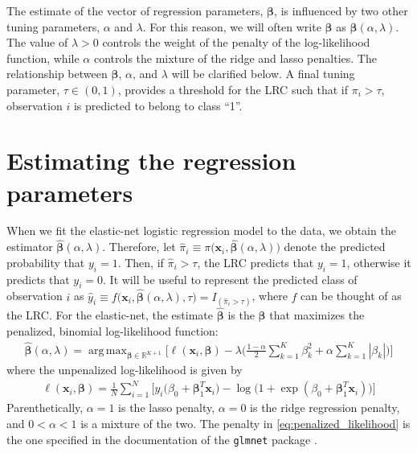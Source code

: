 \documentclass{article}
\DeclareMathOperator*{\argmax}{arg\,max}
\begin{document}
The estimate of the vector of regression parameters, $\boldsymbol{\beta}$, is influenced by two other tuning parameters, 
$\alpha$ and $\lambda$.  For this reason, we will often write $\boldsymbol\beta$ as $\boldsymbol\beta(\alpha,\lambda)$.  
The value of $\lambda > 0$ controls the weight of the
penalty of the log-likelihood function, while $\alpha$ controls the mixture of the ridge and lasso penalties.  
The relationship between $\boldsymbol{\beta}$, $\alpha$, and $\lambda$ will be clarified below.  A final tuning parameter, 
$\tau \in (0, 1)$, provides a threshold for the LRC such that if $\pi_i > \tau$, observation $i$ is predicted to belong
to class ``1''.

\section{Estimating the regression parameters}

When we fit the elastic-net logistic regression model to the data, we obtain the estimator 
$\hat{\boldsymbol\beta}(\alpha,\lambda)$.  Therefore, 
let $\hat\pi_i \equiv \pi \bigl( \mathbf{x}_i,\hat{\boldsymbol\beta}(\alpha,\lambda) \bigr)$ denote the predicted probability 
that $y_i = 1$.  Then, if $\hat\pi_i > \tau$, the LRC predicts that $y_i = 1$, otherwise it predicts that $y_i = 0$.  
It will be useful to represent the predicted class of observation
$i$ as $\hat{y}_i \equiv f \bigl( \mathbf{x}_i,\hat{\boldsymbol{\beta}}(\alpha,\lambda),\tau \bigr) = 
I_{(\hat\pi_i > \tau)}$, where $f$ can be thought of as the LRC.
For the elastic-net, the estimate $\hat{\boldsymbol{\beta}}$ is the $\boldsymbol{\beta}$
that maximizes the penalized, binomial log-likelihood function:
\begin{align}
\label{eq:penalized_likelihood}
\hat{\boldsymbol{\beta}}(\alpha,\lambda) = \argmax_{\boldsymbol\beta \in \mathbb{R}^{K+1}} \Biggl[ \ell(\mathbf{x}_i,\boldsymbol{\beta}) - \lambda 
\biggl( \frac{1-\alpha}{2} \sum_{k=1}^K \beta_k^2 + \alpha \sum_{k=1}^K |\beta_k| \biggr) \Biggr]
\end{align}
\noindent where the unpenalized log-likelihood is given by
\begin{align}
\label{eq:unpenalized_likelihood}
\ell(\mathbf{x}_i,\boldsymbol{\beta}) = \frac{1}{N} \sum_{i=1}^N \biggl[ y_i \bigl( \beta_0 + \boldsymbol\beta_1^T\mathbf{x}_i \bigr) 
  - \log \bigl( 1 + \exp(\beta_0 + \boldsymbol\beta_1^T\mathbf{x}_i ) \bigl) \biggr]
\end{align}
\noindent Parenthetically, $\alpha = 1$ is the lasso penalty, $\alpha = 0$ is the ridge regression penalty,
and $0 < \alpha < 1$ is a mixture of the two. The penalty in \eqref{eq:penalized_likelihood} is the one 
specified in the documentation of the {\tt glmnet} package \cite{glmnet}.
\end{document}
